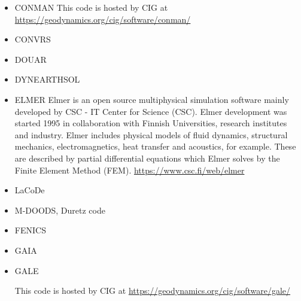 \begin{itemize}


\item CONMAN
This code is hosted by CIG at \url{https://geodynamics.org/cig/software/conman/}

\cite{kirh90}
\cite{itki94}
\cite{kian95}
\cite{kian98}
\cite{itki98}
\cite{befo99}
\cite{nake07}
\cite{dadh07}
\cite{kifr15}


\item CONVRS 
\cite{yoth12}
\cite{yosh13} 
 



\item DOUAR

\cite{brtf08}
\cite{thfb08}
\cite{yahb09}
\cite{brya10}
\cite{lobh10}
\cite{mutg13}
\cite{whbb14}
\cite{neew18}
\cite{koen19}

\item DYNEARTHSOL
\cite{chtl13}


\item ELMER
Elmer is an open source multiphysical simulation software mainly developed by 
CSC - IT Center for Science (CSC). Elmer development was started 1995 in collaboration with 
Finnish Universities, research institutes and industry. Elmer includes physical models of 
fluid dynamics, structural mechanics, electromagnetics, heat transfer and acoustics, 
for example. These are described by partial differential equations which Elmer solves 
by the Finite Element Method (FEM). \url{https://www.csc.fi/web/elmer}

\cite{mals14}


\item{LaCoDe} 
\cite{demh19}

\item M-DOODS, Duretz code
\cite{yatd12}
\cite{yahb13}
\cite{chmd19}\cite{dual19}

\item FENICS
\cite{alrk14}


\item GAIA

\cite{hutm13}

\item GALE

This code is hosted by CIG at \url{https://geodynamics.org/cig/software/gale/}

\cite{fabs08}
\cite{gotc08}
\cite{beve10}
\cite{cmwt10}
\cite{lehm12}\cite{liqi12}
\cite{arbi13}


\end{itemize}
